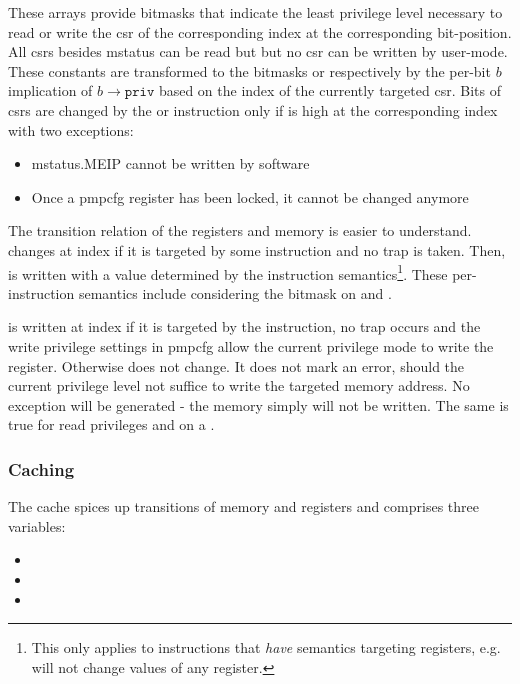 These arrays provide bitmasks that indicate the least privilege level necessary to read or write the \gls{csr} of the corresponding index at the corresponding bit-position.
All \glspl{csr} besides \gls{mstatus} can be read but but no \gls{csr} can be written by user-mode.
These constants are transformed to the bitmasks  or  respectively by the per-bit $ b $ implication of $ b \rightarrow \texttt{priv} $ based on the index of the currently targeted \gls{csr}.
Bits of \glspl{csr} are changed by the  or  instruction only if  is high at the corresponding index with two exceptions:
\begin{itemize}
    \item \gls{mstatus}.MEIP cannot be written by software
    \item Once a \gls{pmpcfg} register has been locked, it cannot be changed anymore
\end{itemize}

The transition relation of the registers and memory is easier to understand.
 changes at index  if it is targeted by some instruction and no trap is taken.
Then,  is written with a value determined by the instruction semantics\footnote{%
    This only applies to instructions that \textit{have} semantics targeting registers, e.g.  will not change values of any register.
}.
These per-instruction semantics include considering the  bitmask on  and .

 is written at index  if it is targeted by the  instruction, no trap occurs and the write privilege settings in \gls{pmpcfg} allow the current privilege mode to write the register.
Otherwise  does not change.
It does not mark an error, should the current privilege level not suffice to write the targeted memory address.
No exception will be generated - the memory simply will not be written.
The same is true for read privileges and  on a .

\subsubsection{Caching}

The cache spices up transitions of memory and registers and comprises three variables:
\begin{itemize}
    \item {}
    \item {}
    \item {}
\end{itemize}

